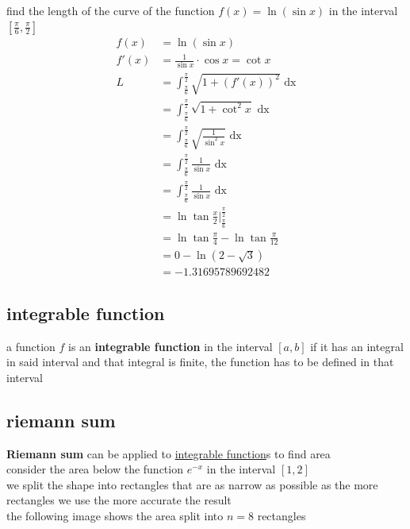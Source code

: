 \documentclass[a4paper,12pt]{article}
\newcommand{\?}{\stackrel{?}{=}}
\begin{document}
\begin{definition}
\begin{my_example}
find the length of the curve of the function \(f(x) = \ln(\sin x)\) in the interval \(\left[\frac{\pi}{6},\frac{\pi}{2}\right]\)\\[0pt]
\begin{align*}
  f(x) &= \ln(\sin x)\\
  f'(x) &= \frac{1}{\sin x} \cdot \cos x = \cot x\\
  L &= \int_{\frac{\pi}{6}}^{\frac{\pi}{2}} \sqrt{1+(f'(x))^2} \text{ dx}\\
  &= \int_{\frac{\pi}{6}}^{\frac{\pi}{2}} \sqrt{1+\cot^2 x} \text{ dx}\\
  &= \int_{\frac{\pi}{6}}^{\frac{\pi}{2}} \sqrt{\frac{1}{\sin^2 x}} \text{ dx}\\
  &= \int_{\frac{\pi}{6}}^{\frac{\pi}{2}} \frac{1}{\sin x} \text{ dx}\\
  &= \int_{\frac{\pi}{6}}^{\frac{\pi}{2}} \frac{1}{\sin x} \text{ dx}\\
  &= \ln\tan\frac{x}{2} \Big|_{\frac{\pi}{6}}^{\frac{\pi}{2}}\\
  &= \ln\tan\frac{\pi}{4} - \ln\tan\frac{\pi}{12}\\
  &= 0 - \ln(2-\sqrt3)\\
  &= -1.31695789692482
\end{align*}
\end{my_example}
\end{definition}
\subsection{integrable function}
\label{sec:org53be8a4}
\begin{definition}
a function \(f\) is an \textbf{integrable function} in the interval \([a,b]\) if it has an integral in said interval and that integral is finite, the function has to be defined in that interval\\[0pt]
\end{definition}
\subsection{riemann sum}
\label{sec:org54fe05e}
\textbf{Riemann sum} can be applied to \hyperref[sec:org53be8a4]{integrable function}s to find area\\[0pt]
consider the area below the function \(e^{-x}\) in the interval \([1,2]\)\\[0pt]
we split the shape into rectangles that are as narrow as possible as the more rectangles we use the more accurate the result\\[0pt]
the following image shows the area split into \(n=8\) rectangles\\[0pt]
\\[0pt]
\end{document}
